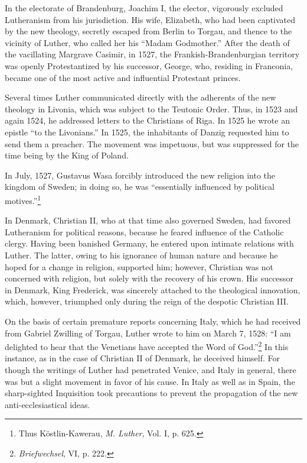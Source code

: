 In the electorate of Brandenburg, Joachim I, the elector, vigorously
excluded Lutheranism from his jurisdiction. His wife, Elizabeth, who
had been captivated by the new theology, secretly escaped from Berlin to
Torgau, and thence to the vicinity of Luther, who called her his
“Madam Godmother.” After the death of the vacillating Margrave
Casimir, in 1527, the Frankish-Brandenburgian territory was openly
Protestantized by his successor, George, who, residing in Franconia,
became one of the most active and influential Protestant princes.

Several times Luther communicated directly with the adherents
of the new theology in Livonia, which was subject to the Teutonic
Order. Thus, in 1523 and again 1524, he addressed letters to the
Christians of Riga. In 1525 he wrote an epistle “to the Livonians.”
In 1525, the inhabitants of Danzig requested him to send them a
preacher. The movement was impetuous, but was suppressed for the
time being by the King of Poland.

In July, 1527, Gustavus Wasa forcibly introduced the new religion
into the kingdom of Sweden; in doing so, he was “essentially influenced
by political motives.”\footnote{Thus Köstlin-Kawerau, \textit{M. Luther}, Vol. I, p. 625.}

In Denmark, Christian II, who at that time also governed Sweden,
had favored Lutheranism for political reasons, because he feared
influence of the Catholic clergy. Having been banished Germany,
he entered upon intimate relations with Luther. The latter, owing to
his ignorance of human nature and because he hoped for a change
in religion, supported him; however, Christian was not concerned
with religion, but solely with the recovery of his crown. His successor
in Denmark, King Frederick, was sincerely attached to the theological
innovation, which, however, triumphed only during the reign of the
despotic Christian III.

On the basis of certain premature reports concerning Italy, which
he had received from Gabriel Zwilling of Torgau, Luther wrote to
him on March 7, 1528: “I am delighted to hear that the Venetians
have accepted the Word of God.”\footnote{\textit{Briefwechsel}, VI, p. 222.}
In this instance, as in the case
of Christian II of Denmark, he deceived himself. For though the
writings of Luther had penetrated Venice, and Italy in general, there
was but a slight movement in favor of his cause. In Italy as well as in
Spain, the sharp-sighted Inquisition took precautions to prevent the
propagation of the new anti-ecclesiastical ideas.
